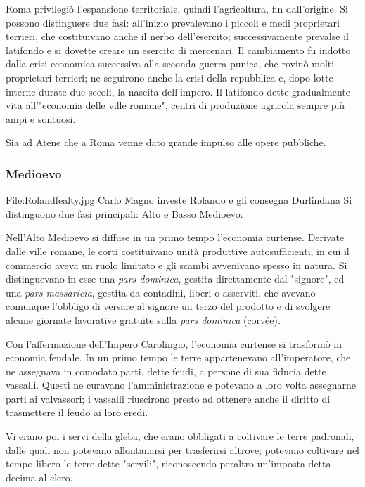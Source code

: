 Roma privilegiò l'espansione territoriale, quindi l'agricoltura, fin 
dall'origine. Si possono distinguere due fasi: all'inizio prevalevano i piccoli 
e medi proprietari terrieri, che costituivano anche il nerbo dell'esercito; 
successivamente prevalse il latifondo e si dovette creare un esercito di 
mercenari. Il cambiamento fu indotto dalla crisi economica successiva alla 
seconda guerra punica, che rovinò molti proprietari terrieri; ne seguirono 
anche la crisi della repubblica e, dopo lotte interne durate due secoli, la 
nascita dell'impero. Il latifondo dette gradualmente vita all'"economia delle 
ville romane", centri di produzione agricola sempre più ampi e 
sontuosi.

Sia ad Atene che a Roma venne dato grande impulso alle opere pubbliche.

\subsubsection{Medioevo}

File:Rolandfealty.jpg Carlo Magno investe Rolando e gli consegna Durlindana
Si distinguono due fasi principali: Alto e Basso Medioevo.

Nell'Alto Medioevo si diffuse in un primo tempo l'economia curtense. 
Derivate dalle ville romane, le corti 
costituivano unità produttive autosufficienti, in cui il commercio aveva un 
ruolo limitato e gli scambi avvenivano spesso in natura. Si 
distinguevano in esse una \emph{pars dominica}, gestita direttamente dal 
"signore", ed una \emph{pars massaricia}, gestita da contadini, liberi o 
asserviti, che avevano comunque l'obbligo di versare al signore un terzo del 
prodotto e di svolgere alcune giornate lavorative gratuite sulla \emph{pars 
dominica} (corvée).

Con l'affermazione dell'Impero Carolingio, l'economia curtense si trasformò 
in economia feudale. In un primo tempo le terre appartenevano 
all'imperatore, che ne assegnava in comodato parti, dette feudi, 
a persone di sua fiducia dette vassalli. Questi ne curavano 
l'amministrazione e potevano a loro volta assegnarne parti ai valvassori; i 
vassalli riuscirono presto ad ottenere anche il diritto di trasmettere il feudo 
ai loro eredi.

Vi erano poi i servi della gleba, che erano obbligati a 
coltivare le terre padronali, dalle quali non potevano allontanarsi per 
trasferirsi altrove; potevano coltivare nel tempo libero le terre dette 
"servili", riconoscendo peraltro un'imposta detta decima al clero.

